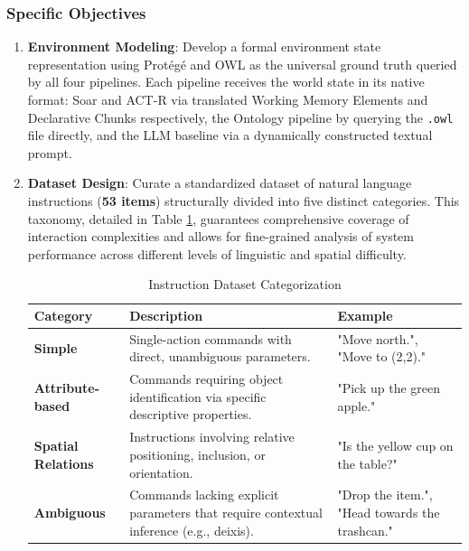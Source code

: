 \documentclass[a4paper]{article}
\begin{document}
\subsubsection{Specific Objectives}
\begin{enumerate}
    \item \textbf{Environment Modeling}: Develop a formal environment state representation using Protégé and OWL as the universal ground truth queried by all four pipelines. Each pipeline receives the world state in its native format: Soar and ACT-R via translated Working Memory Elements and Declarative Chunks respectively, the Ontology pipeline by querying the \texttt{.owl} file directly, and the LLM baseline via a dynamically constructed textual prompt.

    \item \textbf{Dataset Design}: Curate a standardized dataset of natural language instructions (\textbf{53 items}) structurally divided into five distinct categories. This taxonomy, detailed in Table \ref{tab:dataset_design}, guarantees comprehensive coverage of interaction complexities and allows for fine-grained analysis of system performance across different levels of linguistic and spatial difficulty.

\begin{table}[htbp]
    \centering
    \footnotesize
    \renewcommand{\arraystretch}{1.4}
    \caption{Instruction Dataset Categorization}
    \label{tab:dataset_design}
    \begin{tabularx}{\textwidth}{@{} l X X @{}}
        \toprule
        \textbf{Category} & \textbf{Description} & \textbf{Example} \\
        \midrule
        \textbf{Simple} & Single-action commands with direct, unambiguous parameters. & "Move north.", "Move to (2,2)." \\
        
        \textbf{Attribute-based} & Commands requiring object identification via specific descriptive properties. & "Pick up the green apple." \\
        
        \textbf{Spatial Relations} & Instructions involving relative positioning, inclusion, or orientation. & "Is the yellow cup on the table?" \\
        
        \textbf{Ambiguous} & Commands lacking explicit parameters that require contextual inference (e.g., deixis). & "Drop the item.", "Head towards the trashcan." \\
        

\end{tabularx}
\end{table}
\end{enumerate}
\end{document}
